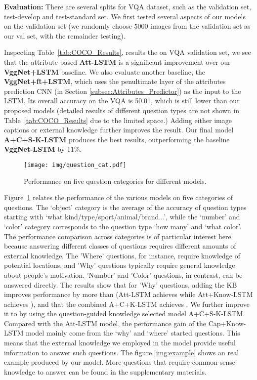 \documentclass[10pt,journal,compsoc]{IEEEtran}
\begin{document}
\vspace{3pt}
\noindent\textbf{Evaluation:} There are several splits for VQA dataset, such as the validation set, test-develop and test-standard set. We first tested several aspects of our models on the validation set (we randomly choose 5000 images from the validation set as our val set, with the remainder testing). 

Inspecting Table~\ref{tab:COCO_Results}, results the on VQA validation set, we see that the attribute-based \textbf{Att-LSTM} is a significant improvement over our \textbf{VggNet+LSTM} baseline. We also evaluate another baseline, the \textbf{VggNet+ft+LSTM}, which uses the penultimate layer of the attributes prediction CNN (in Section \ref{subsec:Attributes_Predictor}) as the input to the LSTM. Its overall accuracy on the VQA is 50.01, which is still lower than our proposed models (detailed results of different question types are not shown in Table~\ref{tab:COCO_Results} due to the limited space.) Adding either image captions or external knowledge further improves the result. Our final model \textbf{A+C+S-K-LSTM} produces the best results, outperforming the baseline \textbf{VggNet-LSTM} by 11\%. 

\begin{figure}[b!]
\vspace{-10pt}
\begin{center}
   \texttt{[image: img/question\_cat.pdf]}
\end{center}
\vspace{-13pt}
   \caption{Performance on five question categories for different models.}
\label{performance_trend}
\end{figure}

Figure~\ref{performance_trend} relates the performance of the various models on five categories of questions. The `object' category is the average of the accuracy of question types starting with `what kind/type/sport/animal/brand...', while the `number' and `color' category corresponds to the question type `how many' and `what color'. The performance comparison across categories is of particular interest here because answering different classes of questions requires different amounts of external knowledge.  The 'Where' questions, for instance, require knowledge of potential locations, and 'Why' questions typically require general knowledge about people's motivation. 'Number' and 'Color' questions, in contrast, can be answered directly. The results show that for 'Why' questions, adding the KB improves performance by more than  (Att-LSTM achieves  while Att+Know-LSTM achieves ), and that the combined A+C+K-LSTM achieves . We further improve it to  by using the question-guided knowledge selected model A+C+S-K-LSTM. Compared with the Att-LSTM model, the performance gain of the Cap+Know-LSTM model mainly come from the `why' and `where' started questions. This means that the external knowledge we employed in the model provide useful information to answer such questions. The figure \ref{img:example} shows an real example produced by our model. More questions that require common-sense knowledge to answer can be found in the supplementary materials.
\end{document}

